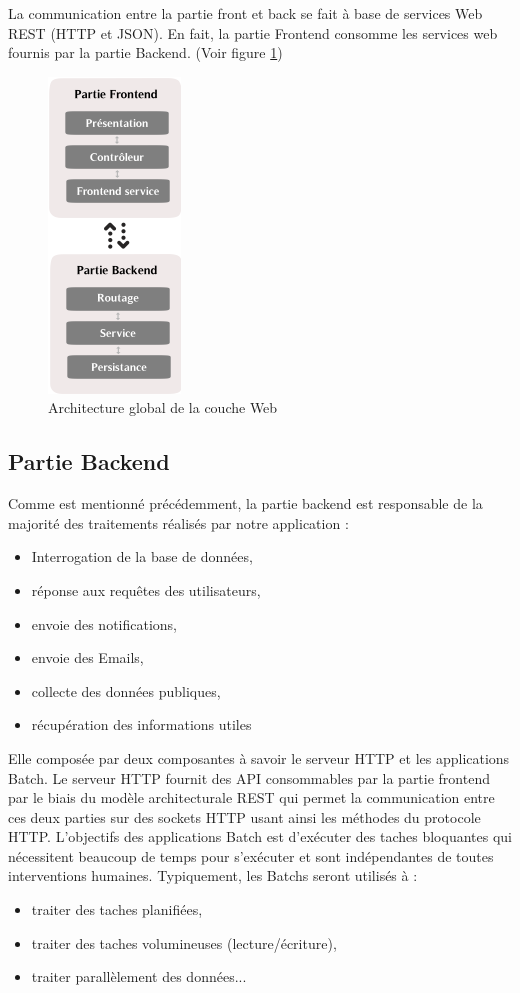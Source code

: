 La communication entre la partie front et back se fait à base de services Web REST (HTTP et JSON). En fait, la partie Frontend consomme les services web fournis par la partie Backend. (Voir figure \ref{fig3.2})

\begin{figure}[!h]
	\begin{center}
		\includegraphics{figures/liaison}
	\end{center}
	\caption{Architecture global de la couche Web}
	\label{fig3.2}
\end{figure}

\subsection{Partie Backend}

\qquad Comme est mentionné précédemment, la partie backend est responsable de la majorité des traitements réalisés par notre application : 
\begin{itemize}
	\item Interrogation de la base de données,
	\item réponse aux requêtes des utilisateurs,
	\item envoie des notifications,
	\item envoie des Emails,
	\item collecte des données publiques,
	\item récupération des informations utiles
\end{itemize}

Elle composée par deux composantes à savoir le serveur HTTP et les applications Batch. Le serveur HTTP fournit des API consommables par la partie frontend par le biais du modèle architecturale REST qui permet la communication entre ces deux parties sur des sockets HTTP usant ainsi les méthodes du protocole HTTP. L'objectifs des applications Batch est d'exécuter des taches bloquantes qui nécessitent beaucoup de temps pour s'exécuter et sont indépendantes de toutes interventions humaines. Typiquement, les Batchs seront utilisés à :
\begin{itemize}
	\item traiter des taches planifiées,
	\item traiter des taches volumineuses (lecture/écriture),
	\item traiter parallèlement des données...\\
\end{itemize}

